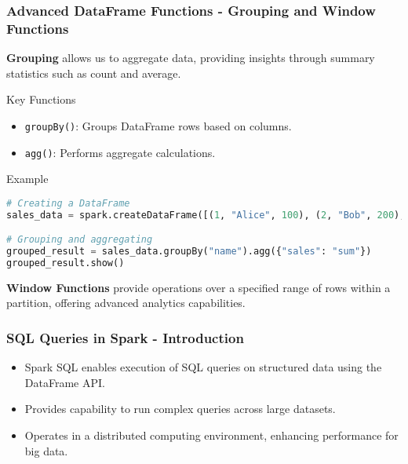 \documentclass[aspectratio=169]{beamer}
\begin{document}
\begin{frame}[fragile]
    \frametitle{Advanced DataFrame Functions - Grouping and Window Functions}
    \textbf{Grouping} allows us to aggregate data, providing insights through summary statistics such as count and average.
    
    \begin{block}{Key Functions}
        \begin{itemize}
            \item \texttt{groupBy()}: Groups DataFrame rows based on columns.
            \item \texttt{agg()}: Performs aggregate calculations.
        \end{itemize}
    \end{block}

    \begin{block}{Example}
    \begin{lstlisting}[language=Python]
# Creating a DataFrame
sales_data = spark.createDataFrame([(1, "Alice", 100), (2, "Bob", 200), (1, "Alice", 150)], ["id", "name", "sales"])

# Grouping and aggregating
grouped_result = sales_data.groupBy("name").agg({"sales": "sum"})
grouped_result.show()
    \end{lstlisting}
    \end{block}

    \textbf{Window Functions} provide operations over a specified range of rows within a partition, offering advanced analytics capabilities.
\end{frame}

\begin{frame}[fragile]
    \frametitle{SQL Queries in Spark - Introduction}
    \begin{itemize}
        \item Spark SQL enables execution of SQL queries on structured data using the DataFrame API.
        \item Provides capability to run complex queries across large datasets.
        \item Operates in a distributed computing environment, enhancing performance for big data.
    \end{itemize}
\end{frame}
\end{document}
